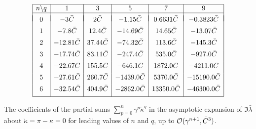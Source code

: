 \documentclass[12pt,a5paper]{article}
\begin{document}
\begin{table}
\centering
\[
\begin{array}{|c|c|c|c|c|c|}
\hline
n\backslash q & 1 & 3 & 5 & 7 & 9\\
\hline
&&&&&\\[-2ex]
0 & -3\bar{C} & 2\bar{C} & -1.15\bar{C} & 0.6631\bar{C} & -0.3823\bar{C}
\\[1ex]
1 & -7.8\bar{C} & 12.4\bar{C} & -14.69\bar{C} & 14.65\bar{C} & -13.07\bar{C}
\\[1ex]
2 & -12.81\bar{C} & 37.44\bar{C} & -74.32\bar{C} & 113.6\bar{C} & -145.3\bar{C}
\\[1ex]
3 & -17.74\bar{C} & 83.11\bar{C} & -247.4\bar{C} & 535.0\bar{C} & -927.0\bar{C}
\\[1ex]
4 & -22.67\bar{C} & 155.5\bar{C} & -646.1\bar{C} & 1872.0\bar{C} & -4211.0\bar{C}
\\[1ex]
5 & -27.61\bar{C} & 260.7\bar{C} & -1439.0\bar{C}  & 5370.0\bar{C} & -15190.0\bar{C}
\\[1ex]
6 & -32.54\bar{C} & 404.9\bar{C} & -2862.0\bar{C}  & 13350.0\bar{C} & -46300.0\bar{C}
\\[1ex]
\hline
\end{array}
\]
\caption{The coefficients of the partial sums $\sum_{p=0}^{n}\gamma^p\grave{\kappa}^q$ in the 
asymptotic expansion of $\Im\bar{\lambda}$ about $\grave{\kappa}=\pi-\kappa=0$ 
for leading values of $n$ and $q$, up to ${\cal O}(\gamma^{n+1},\bar{C}^3)$.}
\label{tab:partial:kappa:pi:im}
\end{table}

\clearpage
\newpage
\appendix
{}
\end{document}
